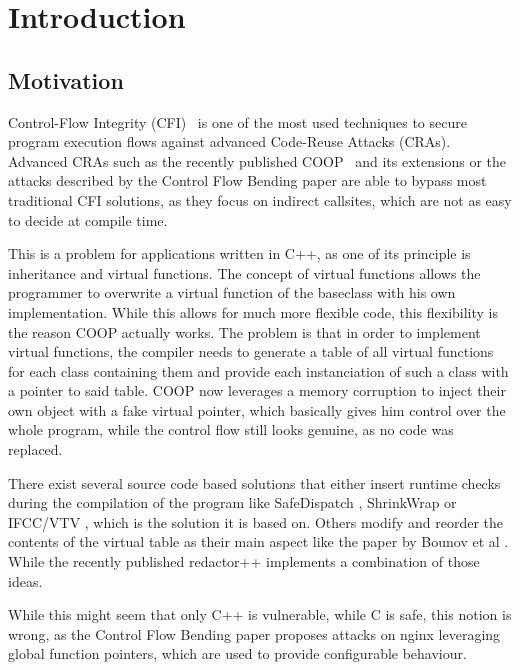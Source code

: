 \chapter{Introduction}
\label{chapter:Introduction}

\section{Motivation}
Control-Flow Integrity (CFI)~\cite{abadi:cfi2, abadi:cfi} is one of the most used techniques to secure program execution flows against advanced Code-Reuse Attacks (CRAs).
Advanced CRAs such as the recently published COOP~\cite{schuster:coop} and its extensions \cite{crane:readactor++} or the attacks described by the Control Flow Bending paper \cite{carlini:bending} are able to bypass most traditional CFI solutions, as they focus on indirect callsites, which are not as easy to decide at compile time.

This is a problem for applications written in C++, as one of its principle is inheritance and virtual functions. The concept of virtual functions allows the programmer to overwrite a virtual function of the baseclass with his own implementation. While this allows for much more flexible code, this flexibility is the reason COOP actually works. The problem is that in order to implement virtual functions, the compiler needs to generate a table of all virtual functions for each class containing them and provide each instanciation of such a class with a pointer to said table. COOP now leverages a memory corruption to inject their own object with a fake virtual pointer, which basically gives him control over the whole program, while the control flow still looks genuine, as no code was replaced. 

There exist several source code based solutions that either insert runtime checks during the compilation of the program like SafeDispatch \cite{safedispatch:jang}, ShrinkWrap \cite{haller:shrinkwrap} or IFCC/VTV \cite{vtv:tice}, which is the solution it is based on. Others modify and reorder the contents of the virtual table as their main aspect like the paper by Bounov et al \cite{bounov:interleaving}. While the recently published redactor++ \cite{crane:readactor++} implements a combination of those ideas.

While this might seem that only C++ is vulnerable, while C is safe, this notion is wrong, as the Control Flow Bending paper \cite{carlini:bending} proposes attacks on nginx leveraging global function pointers, which are used to provide configurable behaviour.

